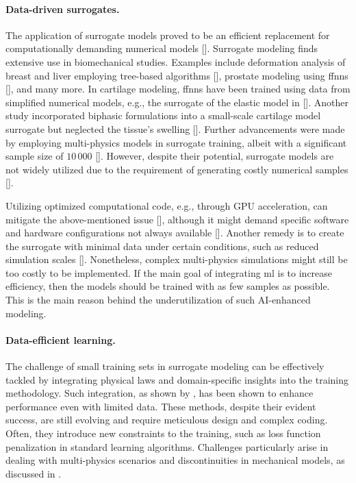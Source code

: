 \documentclass[12pt,a4paper]{report}
\begin{document}
\paragraph{Data-driven surrogates.} The application of surrogate models proved to be an efficient replacement for computationally demanding numerical models [\cite{cai2021,liu2019,martinez2017}]. Surrogate modeling finds extensive use in biomechanical studies. Examples include deformation analysis of breast and liver employing tree-based algorithms [\cite{martin-guerrero2016}], prostate modeling using \acp{ffnn} [\cite{jahya2013}], and many more. In cartilage modeling, \acp{ffnn} have been trained using data from simplified numerical models, e.g., the surrogate of the elastic model in [\cite{paiva2012}]. Another study incorporated biphasic formulations into a small-scale cartilage model surrogate but neglected the tissue's swelling [\cite{arbabi2016a}]. Further advancements were made by employing multi-physics models in surrogate training, albeit with a significant sample size of $10\,000$ [\cite{arbabi2016b}]. However, despite their potential, surrogate models are not widely utilized due to the requirement of generating costly numerical samples [\cite{frank2020}].

Utilizing optimized computational code, e.g., through GPU acceleration, can mitigate the above-mentioned issue [\cite{johnsen2015}], although it might demand specific software and hardware configurations not always available [\cite{marinkovic2019}]. Another remedy is to create the surrogate with minimal data under certain conditions, such as reduced simulation scales [\cite{faisal2023}]. Nonetheless, complex multi-physics simulations might still be too costly to be implemented. If the main goal of integrating \ac{ml} is to increase efficiency, then the models should be trained with as few samples as possible. This is the main reason behind the underutilization of such AI-enhanced modeling.

\paragraph{Data-efficient learning.} The challenge of small training sets in surrogate modeling can be effectively tackled by integrating physical laws and domain-specific insights into the training methodology. Such integration, as shown by \cite{kashinath2021,linka2021,hoerig2020}, has been shown to enhance performance even with limited data. These methods, despite their evident success, are still evolving and require meticulous design and complex coding. Often, they introduce new constraints to the training, such as loss function penalization in standard learning algorithms. Challenges particularly arise in dealing with multi-physics scenarios and discontinuities in mechanical models, as discussed in \cite{coutinho2023,cai2021b,karniadakis2021,fuks2020}.
\end{document}
